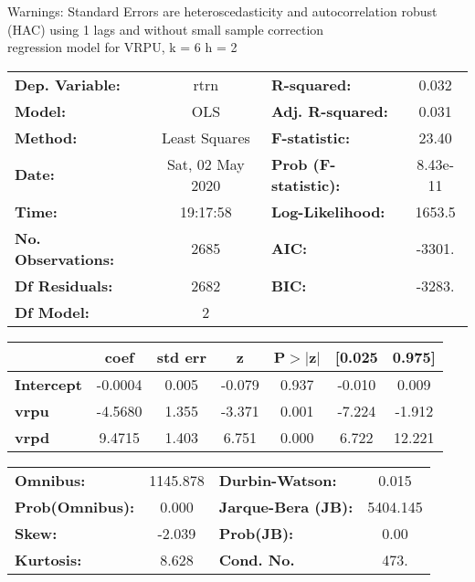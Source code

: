 Warnings: \newline
 [1] Standard Errors are heteroscedasticity and autocorrelation robust (HAC) using 1 lags and without small sample correction\\ 

regression model for VRPU, k = 6 h = 2\begin{center}
\begin{tabular}{lclc}
\toprule
\textbf{Dep. Variable:}    &       rtrn       & \textbf{  R-squared:         } &     0.032   \\
\textbf{Model:}            &       OLS        & \textbf{  Adj. R-squared:    } &     0.031   \\
\textbf{Method:}           &  Least Squares   & \textbf{  F-statistic:       } &     23.40   \\
\textbf{Date:}             & Sat, 02 May 2020 & \textbf{  Prob (F-statistic):} &  8.43e-11   \\
\textbf{Time:}             &     19:17:58     & \textbf{  Log-Likelihood:    } &    1653.5   \\
\textbf{No. Observations:} &        2685      & \textbf{  AIC:               } &    -3301.   \\
\textbf{Df Residuals:}     &        2682      & \textbf{  BIC:               } &    -3283.   \\
\textbf{Df Model:}         &           2      & \textbf{                     } &             \\
\bottomrule
\end{tabular}
\begin{tabular}{lcccccc}
                   & \textbf{coef} & \textbf{std err} & \textbf{z} & \textbf{P$> |$z$|$} & \textbf{[0.025} & \textbf{0.975]}  \\
\midrule
\textbf{Intercept} &      -0.0004  &        0.005     &    -0.079  &         0.937        &       -0.010    &        0.009     \\
\textbf{vrpu}      &      -4.5680  &        1.355     &    -3.371  &         0.001        &       -7.224    &       -1.912     \\
\textbf{vrpd}      &       9.4715  &        1.403     &     6.751  &         0.000        &        6.722    &       12.221     \\
\bottomrule
\end{tabular}
\begin{tabular}{lclc}
\textbf{Omnibus:}       & 1145.878 & \textbf{  Durbin-Watson:     } &    0.015  \\
\textbf{Prob(Omnibus):} &   0.000  & \textbf{  Jarque-Bera (JB):  } & 5404.145  \\
\textbf{Skew:}          &  -2.039  & \textbf{  Prob(JB):          } &     0.00  \\
\textbf{Kurtosis:}      &   8.628  & \textbf{  Cond. No.          } &     473.  \\
\bottomrule
\end{tabular}
\end{center}

